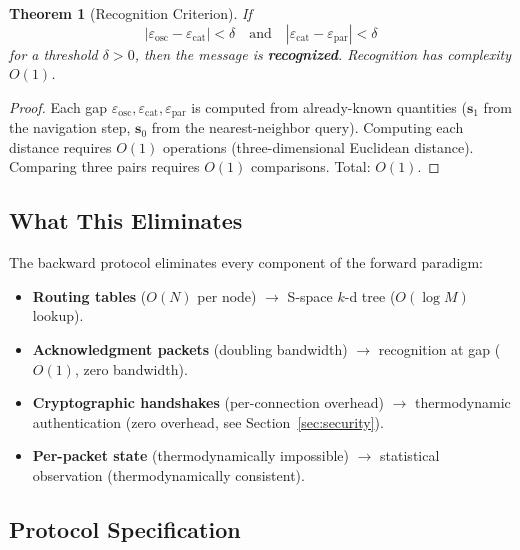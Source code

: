 \documentclass[11pt,twocolumn,a4paper]{article}
\newtheorem{theorem}{Theorem}[section]
\theoremstyle{definition}
\newcommand{\eps}{\varepsilon}
\begin{document}
\begin{theorem}[Recognition Criterion]\label{thm:recognition}
If
\begin{equation}\label{eq:recognition_criterion}
  |\eps_{\mathrm{osc}} - \eps_{\mathrm{cat}}| < \delta \quad \text{and} \quad
  |\eps_{\mathrm{cat}} - \eps_{\mathrm{par}}| < \delta
\end{equation}
for a threshold $\delta > 0$, then the message is \textbf{recognized}. Recognition
has complexity $O(1)$.
\end{theorem}

\begin{proof}
Each gap $\eps_{\mathrm{osc}}, \eps_{\mathrm{cat}}, \eps_{\mathrm{par}}$ is computed
from already-known quantities ($\mathbf{s}_1$ from the navigation step, $\mathbf{s}_0$
from the nearest-neighbor query). Computing each distance requires $O(1)$ operations
(three-dimensional Euclidean distance). Comparing three pairs requires $O(1)$ comparisons.
Total: $O(1)$.
\end{proof}

\subsection{What This Eliminates}\label{sec:backward:eliminates}

The backward protocol eliminates every component of the forward paradigm:

\begin{itemize}
  \item \textbf{Routing tables} ($O(N)$ per node) $\to$ S-space $k$-d tree ($O(\log M)$ lookup).
  \item \textbf{Acknowledgment packets} (doubling bandwidth) $\to$ recognition at gap ($O(1)$, zero bandwidth).
  \item \textbf{Cryptographic handshakes} (per-connection overhead) $\to$ thermodynamic authentication (zero overhead, see Section~\ref{sec:security}).
  \item \textbf{Per-packet state} (thermodynamically impossible) $\to$ statistical observation (thermodynamically consistent).
\end{itemize}

\subsection{Protocol Specification}\label{sec:backward:protocol}
\end{document}
